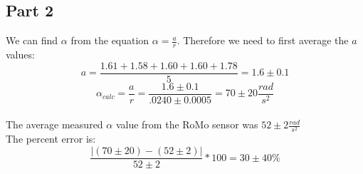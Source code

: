 \documentclass[10pt, letterpaper]{article}
\begin{document}
\subsection{Part 2}
We can find $\alpha $ from the equation $\alpha = \frac{a}{r}$. Therefore we need to first average the $a$ values:
\[ a = \frac{1.61 + 1.58 + 1.60 + 1.60 + 1.78}{5} = 1.6 \pm 0.1 \]
\[ \alpha _{calc} = \frac{a}{r} = \frac{1.6 \pm 0.1}{.0240 \pm 0.0005} = 70 \pm 20 \frac{rad}{s^2} \] \\

The average measured $\alpha $ value from the RoMo sensor was $52 \pm 2 \frac{rad}{s^2}$ \\

The percent error is:
\[ \frac{|(70 \pm 20) - (52 \pm 2)|}{52 \pm 2}*100 = \boxed{30 \pm 40 \%} \]
\end{document}
